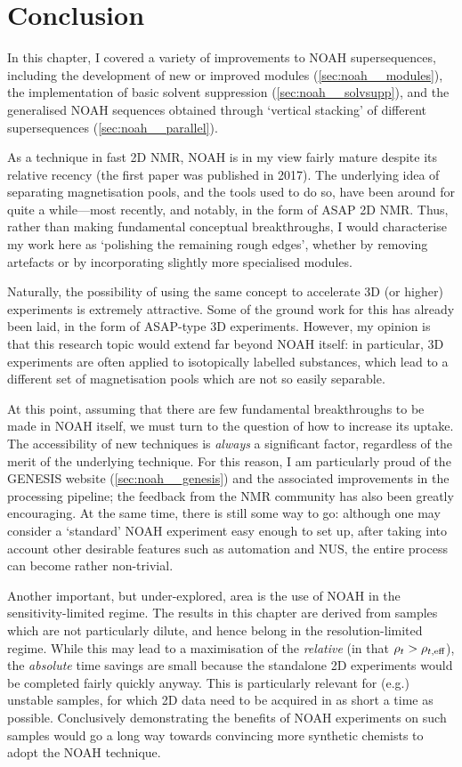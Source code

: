 \section{Conclusion}
\label{sec:noah__conclusion}

In this chapter, I covered a variety of improvements to NOAH supersequences, including the development of new or improved modules (\cref{sec:noah__modules}), the implementation of basic solvent suppression (\cref{sec:noah__solvsupp}), and the generalised NOAH sequences obtained through `vertical stacking' of different supersequences (\cref{sec:noah__parallel}).

As a technique in fast 2D NMR, NOAH is in my view fairly mature despite its relative recency (the first paper was published in 2017\autocite{Kupce2017ACIE}).
The underlying idea of separating magnetisation pools, and the tools used to do so, have been around for quite a while---most recently, and notably, in the form of ASAP 2D NMR.
Thus, rather than making fundamental conceptual breakthroughs, I would characterise my work here as `polishing the remaining rough edges', whether by removing artefacts or by incorporating slightly more specialised modules.

Naturally, the possibility of using the same concept to accelerate 3D (or higher) experiments is extremely attractive.
Some of the ground work for this has already been laid, in the form of ASAP-type 3D experiments.\autocite{Schanda2009PNMRS}
However, my opinion is that this research topic would extend far beyond NOAH itself: in particular, 3D experiments are often applied to isotopically labelled substances, which lead to a different set of magnetisation pools which are not so easily separable.

At this point, assuming that there are few fundamental breakthroughs to be made in NOAH itself, we must turn to the question of how to increase its uptake.
The accessibility of new techniques is \textit{always} a significant factor, regardless of the merit of the underlying technique.
For this reason, I am particularly proud of the GENESIS website (\cref{sec:noah__genesis}) and the associated improvements in the processing pipeline; the feedback from the NMR community has also been greatly encouraging.
At the same time, there is still some way to go: although one may consider a `standard' NOAH experiment easy enough to set up, after taking into account other desirable features such as automation and NUS, the entire process can become rather non-trivial.

Another important, but under-explored, area is the use of NOAH in the sensitivity-limited regime.
The results in this chapter are derived from samples which are not particularly dilute, and hence belong in the resolution-limited regime.
While this may lead to a maximisation of the \textit{relative} (in that $\rho_t > \rho_{t,\text{eff}}$), the \textit{absolute} time savings are small because the standalone 2D experiments would be completed fairly quickly anyway.
This is particularly relevant for (e.g.) unstable samples, for which 2D data need to be acquired in as short a time as possible.
Conclusively demonstrating the benefits of NOAH experiments on such samples would go a long way towards convincing more synthetic chemists to adopt the NOAH technique.
